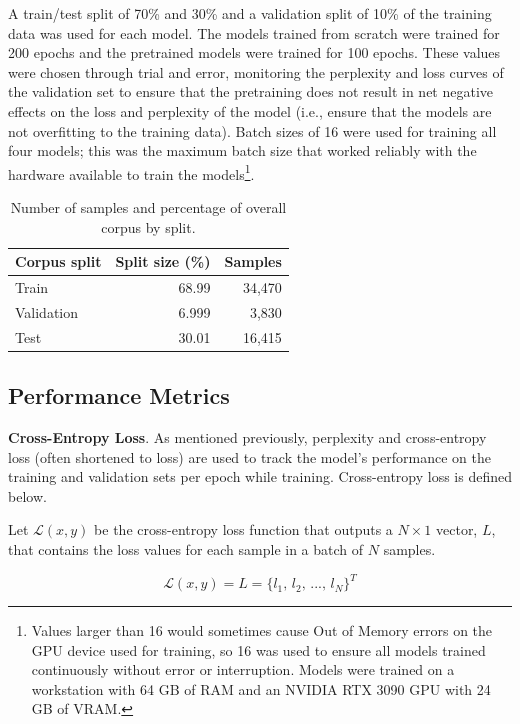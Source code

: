 \documentclass[12pt]{article}
\begin{document}
A train/test split of 70\% and 30\% and a validation split of 10\% of the training data was used for each model. The models trained from scratch were trained for 200 epochs and the pretrained models were trained for 100 epochs. These values were chosen through trial and error, monitoring the perplexity and loss curves of the validation set to ensure that the pretraining does not result in net negative effects on the loss and perplexity of the model (i.e., ensure that the models are not overfitting to the training data). Batch sizes of 16 were used for training all four models; this was the maximum batch size that worked reliably with the hardware available to train the models\footnote{Values larger than 16 would sometimes cause Out of Memory errors on the GPU device used for training, so 16 was used to ensure all models trained continuously without error or interruption. Models were trained on a workstation with 64 GB of RAM and an NVIDIA RTX 3090 GPU with 24 GB of VRAM.}.

\begin{table}[!t]
    \centering
    \begin{tabular}{l r r}
        \toprule
        Corpus split & Split size (\%) & Samples \\
        \midrule
        Train        & 68.99           & 34,470  \\
        Validation   & 6.999           & 3,830   \\
        Test         & 30.01           & 16,415  \\
        \bottomrule
    \end{tabular}
    \caption{Number of samples and percentage of overall corpus by split.}
    \label{tab:corpus_splits}
\end{table}

\subsection{Performance Metrics}\label{sec:performance_metrics}
\textbf{Cross-Entropy Loss}. As mentioned previously, perplexity and cross-entropy loss (often shortened to loss) are used to track the model's performance on the training and validation sets per epoch while training. Cross-entropy loss is defined below.

Let $\mathcal{L}(x, y)$ be the cross-entropy loss function that outputs a $N \times 1$ vector, $L$, that contains the loss values for each sample in a batch of $N$ samples.

\begin{equation}\label{eq:cross_entropy_defs}
    \mathcal{L}(x, y) = L = \{\mbox{$l_1$, $l_2$, ..., $l_N$}\}^T
\end{equation}
\end{document}
